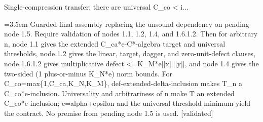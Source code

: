 \documentclass{article}
\newcommand{\step}[1]{\par\noindent\hangindent=3.5em\hangafter=1%
  \makebox[3.5em][l]{\textbf{#1.}}}
\newcommand{\steptag}[1]{\hfill{\small\textsf{[#1]}}}
\begin{document}
\begin{proofbox}{Single-compression transfer: there are universal C\_co < i...}
\step{1.6.1.4} Guarded final assembly replacing the unsound dependency on pending node 1.5. Require validation of nodes 1.1, 1.2, 1.4, and 1.6.1.2. Then for arbitrary n, node 1.1 gives the extended C\_ca*e-C*-algebra target and universal thresholds, node 1.2 gives the linear, target, dagger, and zero-unit-defect clauses, node 1.6.1.2 gives multiplicative defect <=K\_M*e||x||||y||, and node 1.4 gives the two-sided (1 plus-or-minus K\_N*e) norm bounds. For C\_co=max\{1,C\_ca,K\_N,K\_M\}, def-extended-delta-inclusion makes T\_n a C\_co*e-inclusion. Universality and arbitrariness of n make T an extended C\_co*e-inclusion; e=alpha+epsilon and the universal threshold minimum yield the contract. No premise from pending node 1.5 is used. \steptag{validated} \\[4pt]
\end{proofbox}
\end{document}
